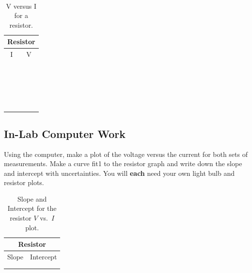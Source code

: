 \pagebreak

\ \\
\vspace*{2cm} 
\begin{table}[htb]
\begin{center}
\begin{tabular}{|c|c|}
\hline
\multicolumn{2}{|c|}{Resistor}\\
\hline
I & V \\
\hline
\hspace*{5cm} & \hspace*{5cm} \\
& \\
\hline
& \\
& \\
\hline
& \\
& \\
\hline
& \\
& \\
\hline
& \\
& \\
\hline
& \\
& \\
\hline
& \\
& \\
\hline
& \\
& \\
\hline
& \\
& \\
\hline
& \\
& \\
\hline
\end{tabular}
\end{center}
\caption{V versus I for a resistor.}
\label{tab:DC:resistor}
\end{table}
\vfill
\pagebreak
\subsection{In-Lab Computer Work}
Using the computer, make a plot of the voltage versus the current for both 
sets of measurements. Make a curve fit1 to the resistor graph and write
down the slope and intercept with uncertainties.  You will {\bf each} 
need your own light bulb and resistor plots.
\begin{table}[htb]
\begin{center}
\begin{tabular}{|c|c|}
\hline
\multicolumn{2}{|c|}{Resistor} \\
\hline
Slope & Intercept \\
\hline
\hspace*{5cm} & \hspace*{5cm} \\
& \\
\hline
\end{tabular}
\end{center}
\caption{Slope and Intercept for the resistor $V$ vs.\ $I$ plot.}
\end{table}




